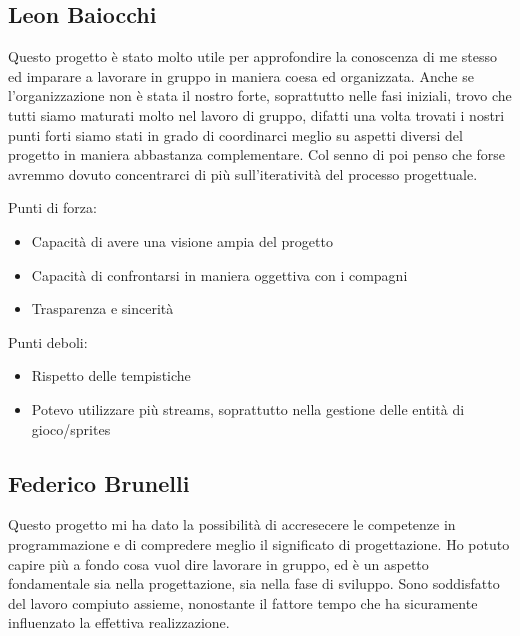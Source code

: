 
\subsection*{Leon Baiocchi}
Questo progetto è stato molto utile per approfondire la conoscenza di me stesso ed imparare a lavorare in gruppo in maniera coesa ed organizzata. Anche se l'organizzazione non è stata il nostro forte, soprattutto nelle fasi iniziali, trovo che tutti siamo maturati molto nel lavoro di gruppo, difatti una volta trovati i nostri punti forti siamo stati in grado di coordinarci meglio su aspetti diversi del progetto in maniera abbastanza complementare. Col senno di poi penso che forse avremmo dovuto concentrarci di più sull'iteratività del processo progettuale.
\textsf{\small }

\begin{flushleft}
	
\textsf{\small Punti di forza:}\\

\begin{itemize}
	\item \textsf{\small Capacità di avere una visione ampia del progetto} 
	\item \textsf{\small Capacità di confrontarsi in maniera oggettiva con i compagni}
	\item \textsf{\small Trasparenza e sincerità}
\end{itemize}

\textsf{\small Punti deboli: }\\

\begin{itemize}
	\item \textsf{\small Rispetto delle tempistiche}
	\item \textsf{\small Potevo utilizzare più streams, soprattutto nella gestione delle entità di gioco/sprites}
\end{itemize}

\end{flushleft}



\subsection*{Federico Brunelli}

\textsf{\small Questo progetto mi ha dato la possibilità di accresecere le competenze in programmazione e di compredere meglio il significato di progettazione.
Ho potuto capire più a fondo cosa vuol dire lavorare in gruppo, ed è un aspetto fondamentale sia nella progettazione, sia nella fase di sviluppo.
Sono soddisfatto del lavoro compiuto assieme, nonostante il fattore tempo che ha sicuramente influenzato la effettiva realizzazione.}

